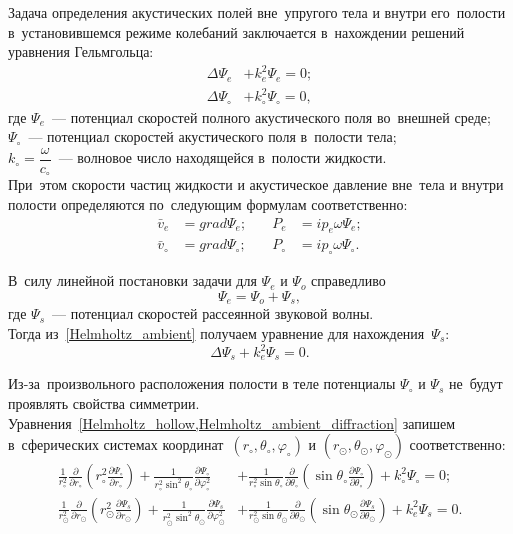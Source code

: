 Задача определения акустических полей вне~упругого тела и внутри его~полости в~установившемся режиме колебаний заключается в~нахождении решений уравнения Гельмгольца:
\begin{align}
\Delta\Psi_e &+ k_e^2\Psi_e = 0;\label{Helmholtz_ambient}\\
\Delta\Psi_\circ &+ k_\circ^2\Psi_\circ = 0,\label{Helmholtz_hollow}
\end{align}
где $\Psi_e$~--- потенциал скоростей полного акустического поля во~внешней среде;\\
$\Psi_\circ$~--- потенциал скоростей акустического поля в~полости тела;\\
$k_\circ = \dfrac{\omega}{c_\circ}$~--- волновое число находящейся в~полости жидкости.\\ При~этом скорости частиц жидкости и акустическое давление вне~тела и внутри полости определяются по~следующим формулам соответственно:
\begin{align}
\bar{v}_e &=  grad\Psi_e; &\quad P_e &= ip_e\omega\Psi_e;\label{eq_ven}\\
\bar{v}_\circ &=  grad\Psi_\circ; &\quad P_\circ &= ip_\circ\omega\Psi_\circ.\label{eq_vc}
\end{align}


В~силу линейной постановки задачи для $\Psi_e$ и $\Psi_o$ справедливо
\begin{equation} \label{potention_speed_ambient}
\Psi_e = \Psi_o + \Psi_s,
\end{equation}
где $\Psi_s$~--- потенциал скоростей рассеянной звуковой волны.\\
Тогда из~\eqref{Helmholtz_ambient} получаем уравнение для нахождения~$\Psi_s$:
\begin{equation} \label{Helmholtz_ambient_diffraction}
\Delta\Psi_s + k_e^2\Psi_s = 0.
\end{equation}

Из-за~произвольного расположения полости в теле потенциалы $\Psi_\circ$ и $\Psi_s$ не~будут проявлять свойства симметрии.
Уравнения~\cref{Helmholtz_hollow,Helmholtz_ambient_diffraction} запишем в~сферических системах координат~$(r_\circ, \theta_\circ, \varphi_\circ)$ и $(r_\odot, \theta_\odot, \varphi_\odot)$ соответственно:
\begin{align}
\frac1{r_\circ^2}\frac\partial{\partial r_\circ}\left(r_\circ^2 \frac{\partial\Psi_\circ}{\partial r_\circ}\right) + \frac1{r_\circ^2\sin^2\theta_\circ}\frac{\partial\Psi_\circ}{\partial\varphi_\circ^2} &+ \frac1{r_\circ^2\sin\theta_\circ}\frac\partial{\partial\theta_\circ} \left(\sin\theta_\circ \frac{\partial\Psi_\circ}{\partial\theta_\circ}\right) + k_\circ^2\Psi_\circ = 0;\\
\frac1{r_\odot^2}\frac\partial{\partial r_\odot}\left(r_\odot^2 \frac{\partial\Psi_s}{\partial r_\odot}\right) + \frac1{r_\odot^2\sin^2\theta_\odot}\frac{\partial\Psi_s}{\partial\varphi_\odot^2} &+ \frac1{r_\odot^2\sin\theta_\odot}\frac\partial{\partial\theta_\odot} \left(\sin\theta_\odot \frac{\partial\Psi_s}{\partial\theta_\odot}\right) + k_e^2\Psi_s = 0.
\end{align}

